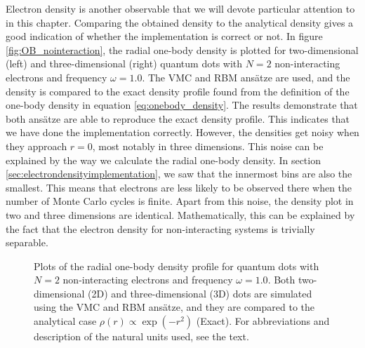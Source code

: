 Electron density is another observable that we will devote particular attention to in this chapter. Comparing the obtained density to the analytical density gives a good indication of whether the implementation is correct or not. In figure \eqref{fig:OB_nointeraction}, the radial one-body density is plotted for two-dimensional (left) and three-dimensional (right) quantum dots with $N=2$ non-interacting electrons and frequency $\omega=1.0$. The VMC and RBM ansätze are used, and the density is compared to the exact density profile found from the definition of the one-body density in equation \ref{eq:onebody_density}. The results demonstrate that both ansätze are able to reproduce the exact density profile. This indicates that we have done the implementation correctly. However, the densities get noisy when they approach $r=0$, most notably in three dimensions. This noise can be explained by the way we calculate the radial one-body density. In section \ref{sec:electrondensityimplementation}, we saw that the innermost bins are also the smallest. This means that electrons are less likely to be observed there when the number of Monte Carlo cycles is finite. Apart from this noise, the density plot in two and three dimensions are identical. Mathematically, this can be explained by the fact that the electron density for non-interacting systems is trivially separable.

\begin{figure}
	\centering
	\captionsetup[subfigure]{labelformat=empty}
	\caption{Plots of the radial one-body density profile for quantum dots with $N=2$ non-interacting electrons and frequency $\omega=1.0$. Both two-dimensional (2D) and three-dimensional (3D) dots are simulated using the VMC and RBM ansätze, and they are compared to the analytical case $\rho(r)\propto\exp(-r^2)$ (Exact). For abbreviations and description of the natural units used, see the text.}
	\label{fig:OB_nointeraction}
\end{figure}

